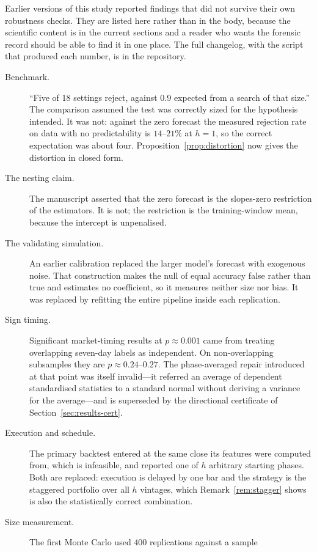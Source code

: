 \documentclass{article}
\theoremstyle{plain}
\theoremstyle{definition}
\begin{document}
Earlier versions of this study reported findings that did not survive their own robustness
checks. They are listed here rather than in the body, because the scientific content is in
the current sections and a reader who wants the forensic record should be able to find it in
one place. The full changelog, with the script that produced each number, is in the
repository.

\begin{description}
  \item[Benchmark.] ``Five of 18 settings reject, against $0.9$ expected from a search of
    that size.'' The comparison assumed the test was correctly sized for the hypothesis
    intended. It was not: against the zero forecast the measured rejection rate on data with
    no predictability is $14$--$21\%$ at $h=1$, so the correct expectation was about four.
    Proposition~\ref{prop:distortion} now gives the distortion in closed form.
  \item[The nesting claim.] The manuscript asserted that the zero forecast is the
    slopes-zero restriction of the estimators. It is not; the restriction is the
    training-window mean, because the intercept is unpenalised.
  \item[The validating simulation.] An earlier calibration replaced the larger model's
    forecast with exogenous noise. That construction makes the null of equal accuracy false
    rather than true and estimates no coefficient, so it measures neither size nor bias. It
    was replaced by refitting the entire pipeline inside each replication.
  \item[Sign timing.] Significant market-timing results at $p\approx0.001$ came from
    treating overlapping seven-day labels as independent. On non-overlapping subsamples they
    are $p\approx0.24$--$0.27$. The phase-averaged repair introduced at that point was
    itself invalid---it referred an average of dependent standardised statistics to a
    standard normal without deriving a variance for the average---and is superseded by the
    directional certificate of Section~\ref{sec:results-cert}.
  \item[Execution and schedule.] The primary backtest entered at the same close its features
    were computed from, which is infeasible, and reported one of $h$ arbitrary starting
    phases. Both are replaced: execution is delayed by one bar and the strategy is the
    staggered portfolio over all $h$ vintages, which Remark~\ref{rem:stagger} shows is also
    the statistically correct combination.
  \item[Size measurement.] The first Monte Carlo used $400$ replications against a sample

\end{description}
\end{document}
